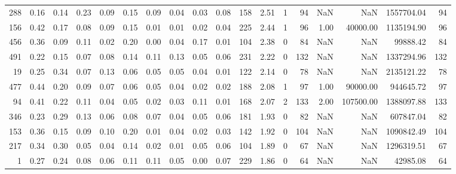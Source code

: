 \begin{tabular}{rrrrrrrrrrllrrrrrr}
          288 & 0.16 & 0.14 & 0.23 & 0.09 & 0.15 & 0.09 & 0.04 & 0.03 & 0.08 & 158 &  2.51 &                  1 &        94 &             NaN &                 NaN &    1557704.04 &                    94 \\
          156 & 0.42 & 0.17 & 0.08 & 0.09 & 0.15 & 0.01 & 0.01 & 0.02 & 0.04 & 225 &  2.44 &                  1 &        96 &            1.00 &            40000.00 &    1135194.90 &                    96 \\
          456 & 0.36 & 0.09 & 0.11 & 0.02 & 0.20 & 0.00 & 0.04 & 0.17 & 0.01 & 104 &  2.38 &                  0 &        84 &             NaN &                 NaN &      99888.42 &                    84 \\
          491 & 0.22 & 0.15 & 0.07 & 0.08 & 0.14 & 0.11 & 0.13 & 0.05 & 0.06 & 231 &  2.22 &                  0 &       132 &             NaN &                 NaN &    1337294.96 &                   132 \\
           19 & 0.25 & 0.34 & 0.07 & 0.13 & 0.06 & 0.05 & 0.05 & 0.04 & 0.01 & 122 &  2.14 &                  0 &        78 &             NaN &                 NaN &    2135121.22 &                    78 \\
          477 & 0.44 & 0.20 & 0.09 & 0.07 & 0.06 & 0.05 & 0.04 & 0.02 & 0.02 & 188 &  2.08 &                  1 &        97 &            1.00 &            90000.00 &     944645.72 &                    97 \\
           94 & 0.41 & 0.22 & 0.11 & 0.04 & 0.05 & 0.02 & 0.03 & 0.11 & 0.01 & 168 &  2.07 &                  2 &       133 &            2.00 &           107500.00 &    1388097.88 &                   133 \\
          346 & 0.23 & 0.29 & 0.13 & 0.06 & 0.08 & 0.07 & 0.04 & 0.05 & 0.06 & 181 &  1.93 &                  0 &        82 &             NaN &                 NaN &     607847.04 &                    82 \\
          153 & 0.36 & 0.15 & 0.09 & 0.10 & 0.20 & 0.01 & 0.04 & 0.02 & 0.03 & 142 &  1.92 &                  0 &       104 &             NaN &                 NaN &    1090842.49 &                   104 \\
          217 & 0.34 & 0.30 & 0.05 & 0.04 & 0.14 & 0.02 & 0.01 & 0.05 & 0.06 & 104 &  1.89 &                  0 &        67 &             NaN &                 NaN &    1296319.51 &                    67 \\
            1 & 0.27 & 0.24 & 0.08 & 0.06 & 0.11 & 0.11 & 0.05 & 0.00 & 0.07 & 229 &  1.86 &                  0 &        64 &             NaN &                 NaN &      42985.08 &                    64 \\

\end{tabular}
